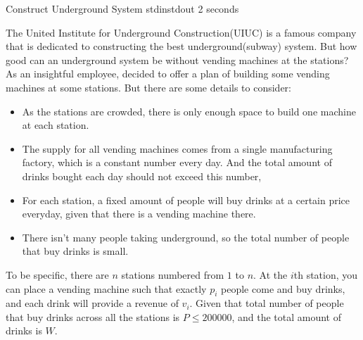 \begin{problem}{Construct Underground System}
{stdin}{stdout}
{2 seconds}{}{}

The United Institute for Underground Construction(UIUC) is a famous company that is dedicated to constructing the best underground(subway) system. But how good can an underground system be without vending machines at the stations? As an insightful employee, \pittoresque decided to offer a plan of building some vending machines at some stations. But there are some details to consider:
\begin{itemize}
    \item As the stations are crowded, there is only enough space to build one machine at each station.
    \item The supply for all vending machines comes from a single manufacturing factory, which is a constant number every day. And the total amount of drinks bought each day should not exceed this number,
    \item For each station, a fixed amount of people will buy drinks at a certain price everyday, given that there is a vending machine there.
    \item There isn't many people taking underground, so the total number of people that buy drinks is small.
\end{itemize}

To be specific, there are $n$ stations numbered from $1$ to $n$. At the $i$th station, you can place a vending machine such that exactly $p_i$ people come and buy drinks, and each drink will provide a revenue of $v_i$. Given that total number of people that buy drinks across all the stations is $P \leq 200000$, and the total amount of drinks is $W$.


\end{problem}
